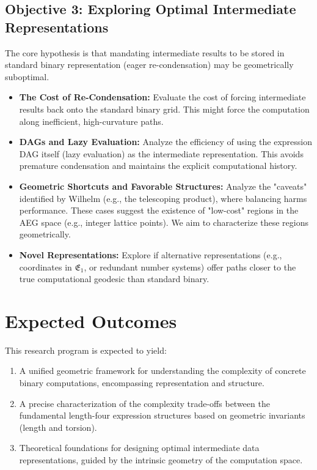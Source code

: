 \documentclass[11pt, a4paper]{article}
\begin{document}
\subsection{Objective 3: Exploring Optimal Intermediate Representations}

The core hypothesis is that mandating intermediate results to be stored in standard binary representation (eager re-condensation) may be geometrically suboptimal.

\begin{itemize}
    \item \textbf{The Cost of Re-Condensation:} Evaluate the cost of forcing intermediate results back onto the standard binary grid. This might force the computation along inefficient, high-curvature paths.
    \item \textbf{DAGs and Lazy Evaluation:} Analyze the efficiency of using the expression DAG itself (lazy evaluation) as the intermediate representation. This avoids premature condensation and maintains the explicit computational history.
    \item \textbf{Geometric Shortcuts and Favorable Structures:} Analyze the "caveats" identified by Wilhelm (e.g., the telescoping product), where balancing harms performance. These cases suggest the existence of "low-cost" regions in the AEG space (e.g., integer lattice points). We aim to characterize these regions geometrically.
    \item \textbf{Novel Representations:} Explore if alternative representations (e.g., coordinates in $\mathfrak{E}_1$, or redundant number systems) offer paths closer to the true computational geodesic than standard binary.
\end{itemize}

\section{Expected Outcomes}

This research program is expected to yield:
\begin{enumerate}
    \item A unified geometric framework for understanding the complexity of concrete binary computations, encompassing representation and structure.
    \item A precise characterization of the complexity trade-offs between the fundamental length-four expression structures based on geometric invariants (length and torsion).
    \item Theoretical foundations for designing optimal intermediate data representations, guided by the intrinsic geometry of the computation space.
\end{enumerate}


\end{document}
